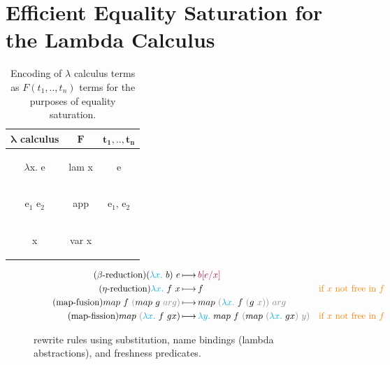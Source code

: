 \section{Efficient Equality Saturation for the Lambda Calculus} %
\label{eqsat-bindings}


\begin{table}
  \begin{tabular}{|c|c|c|}
  \hline
  \textbf{$\bm{\lambda}$ calculus} & $\bm{F}$ & $\bm{t_1, .., t_n}$ \\
  \hline
  \begin{rise}[numbers=none, frame=none]
  $\lambda$x. e
  \end{rise}%
  & lam x & e \\
  \hline
  \begin{rise}[numbers=none, frame=none]
  e$_1$ e$_2$
  \end{rise}%
  & app & e$_1$, e$_2$ \\
  \hline
  \begin{rise}[numbers=none, frame=none]
  x
  \end{rise}%
  & var x & \\
  \hline
  \end{tabular}
  \caption{Encoding of $\lambda$ calculus terms as $F(t_1, .., t_n)$ terms for the purposes of equality saturation.}
  \label{fig:rise-node-repr}
  \end{table}

\begin{figure}
\begin{align*}
    \tag{$\beta$-reduction}\label{beta-reduction}
    ({\color{cyan}\lambda x.}~b)~e \rewritesTo{}& {\color{purple}b[e/x]} \\
    \tag{$\eta$-reduction}\label{eta-reduction}
    {\color{cyan}\lambda x.}~f~x \rewritesTo{}& f &{\color{orange}\text{if}~x~\text{not free in}~f} \\
    \tag{map-fusion}\label{map-fusion}
    map~f~{\color{gray}(}map~g~{\color{gray}arg)} \rewritesTo{}& map~{\color{gray}({\color{cyan}\lambda x.}}~f~{\color{gray}(}g~{\color{gray}x))~arg} \\
    \tag{map-fission}\label{map-fission}
    map~{\color{gray}({\color{cyan}\lambda x.}}~f~gx) \rewritesTo{}& {\color{gray}{\color{cyan}\lambda y.}}~map~f~{\color{gray}(}map~{\color{gray}({\color{cyan}\lambda x.}}~gx{\color{gray})~y)}
    &{\color{orange}\text{if}~x~\text{not free in}~f}
\end{align*}%
\caption{\Rise{} rewrite rules using {\color{purple}substitution}, {\color{cyan}name bindings} (lambda abstractions), and {\color{orange} freshness predicates}.}
\label{fig:example-rules}
\end{figure}

